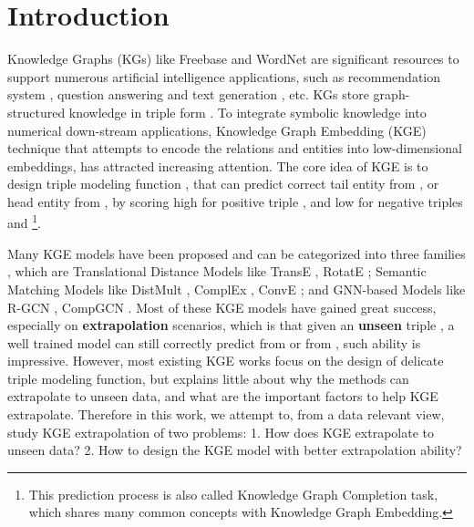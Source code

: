 \documentclass[letterpaper]{article} \usepackage{aaai22}  \usepackage{times}  \usepackage{helvet}  \usepackage{courier}  \usepackage[hyphens]{url}  \usepackage{graphicx} \urlstyle{rm} \def\UrlFont{\rm}  \usepackage{natbib}  \usepackage{caption} \DeclareCaptionStyle{ruled}{labelfont=normalfont,labelsep=colon,strut=off} \frenchspacing  \setlength{\pdfpagewidth}{8.5in}  \setlength{\pdfpageheight}{11in}  \usepackage{algorithm}
\begin{document}
\section{Introduction}
Knowledge Graphs (KGs) like Freebase \cite{SIGMOD_2008_Bollacker_Freebase} and WordNet \cite{ACM_1995_Miller_WordNet} are significant resources to support numerous artificial intelligence applications, such as recommendation system \cite{CIKM_2018_Wang_RippleNet},  question answering \cite{Yasunaga_NAACL_2021_QA-GNN} and text generation \cite{ACL_2020_Zhang_Generation}, etc. KGs store graph-structured knowledge in triple form . To integrate symbolic knowledge into numerical down-stream applications, Knowledge Graph Embedding (KGE) technique that attempts to encode the relations and entities into low-dimensional embeddings, has attracted increasing attention. 
The core idea of KGE is to design triple modeling function , that can predict correct tail entity  from , or head entity  from , by scoring high for positive triple , and low for negative triples  and \footnote{This prediction process is also called Knowledge Graph Completion task, which shares many common concepts with Knowledge Graph Embedding.}.

Many KGE models have been proposed and can be categorized into three families \cite{TKDE_2017_Wang_Survey, 2020_Arora_KG-GNN}, which are Translational Distance Models like TransE \cite{NeurIPS_2013_Bordes_TransE}, RotatE \cite{ICLR_2019_Sun_RotatE}; Semantic Matching Models like DistMult \cite{ICLR_2015_Yang_DistMult}, ComplEx \cite{ICML_2016_Trouillon_ComplEx}, ConvE \cite{AAAI_2018_Dettmers_ConvE_WN18RR}; and GNN-based Models like R-GCN \cite{ESWC_2018_Schlichtkrull_R-GCN}, CompGCN \cite{ICLR_2020_Vashishth_CompGCN}.  
Most of these KGE models have gained great success, especially on \textbf{extrapolation} scenarios, which is that given an \textbf{unseen} triple , a well trained model can still correctly predict  from  or  from , such ability is impressive.
However, most existing KGE works focus on the design of delicate triple modeling function, but explains little about why the methods can extrapolate to unseen data, and what are the important factors to help KGE extrapolate. Therefore in this work, we attempt to, from a data relevant view, study KGE extrapolation of two problems: 1. How does KGE extrapolate to unseen data? 2. How to design the KGE model with better extrapolation ability? 
\end{document}
